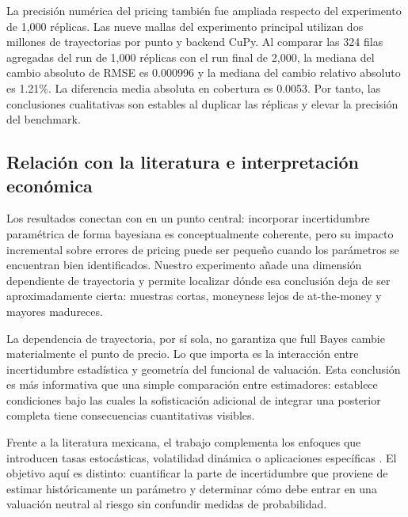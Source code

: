 La precisión numérica del pricing también fue ampliada respecto del experimento de 1,000 réplicas. Las nueve mallas del experimento principal utilizan dos millones de trayectorias por punto y backend CuPy. Al comparar las 324 filas agregadas del run de 1,000 réplicas con el run final de 2,000, la mediana del cambio absoluto de RMSE es 0.000996 y la mediana del cambio relativo absoluto es 1.21\%. La diferencia media absoluta en cobertura es 0.0053. Por tanto, las conclusiones cualitativas son estables al duplicar las réplicas y elevar la precisión del benchmark.

\subsection{Relación con la literatura e interpretación económica}

Los resultados conectan con \citet{romboutsstentoft2014} en un punto central: incorporar incertidumbre paramétrica de forma bayesiana es conceptualmente coherente, pero su impacto incremental sobre errores de pricing puede ser pequeño cuando los parámetros se encuentran bien identificados. Nuestro experimento añade una dimensión dependiente de trayectoria y permite localizar dónde esa conclusión deja de ser aproximadamente cierta: muestras cortas, moneyness lejos de at-the-money y mayores madureces.

La dependencia de trayectoria, por sí sola, no garantiza que full Bayes cambie materialmente el punto de precio. Lo que importa es la interacción entre incertidumbre estadística y geometría del funcional de valuación. Esta conclusión es más informativa que una simple comparación entre estimadores: establece condiciones bajo las cuales la sofisticación adicional de integrar una posterior completa tiene consecuencias cuantitativas visibles.

Frente a la literatura mexicana, el trabajo complementa los enfoques que introducen tasas estocásticas, volatilidad dinámica o aplicaciones específicas \citep{ortiz2016,matias2019,ortizjimenez2026}. El objetivo aquí es distinto: cuantificar la parte de incertidumbre que proviene de estimar históricamente un parámetro y determinar cómo debe entrar en una valuación neutral al riesgo sin confundir medidas de probabilidad.
